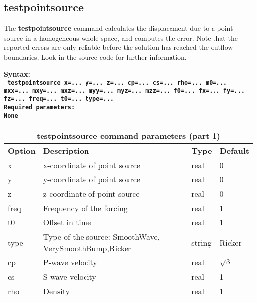 \documentclass[11pt]{report}
\begin{document}
\subsection{testpointsource}
\label{keyword:pointsource}
The {\bf testpointsource} command calculates the displacement due to a point source in a homogeneous
whole space, and computes the error. Note that the reported errors are only reliable before the
solution has reached the outflow boundaries. Look in the source code for further information.
\begin{flushleft}
\bf
Syntax:\\
\tt
testpointsource
x=... y=... z=... cp=... cs=... rho=... m0=... mxx=... mxy=... mxz=... myy=... myz=... mzz=... f0=... fx=... fy=... fz=... freq=... t0=... type=...
\\
\bf 
Required parameters:\\
\rm
None
\end{flushleft}
\begin{center}
\begin{tabular}{|l|p{8cm}|l|l|} \hline
\multicolumn{4}{|c|}{\bf testpointsource command parameters (part 1)}\\ \hline
\bf{Option} & \bf{Description} & \bf{Type} & \bf{Default} \\ \hline \hline
x    & x-coordinate of point source & real & 0 \\ \hline
y    & y-coordinate of point source & real & 0 \\ \hline
z    & z-coordinate of point source & real & 0 \\ \hline
\hline
freq & Frequency of the forcing & real & 1 \\ \hline
t0   & Offset in time & real & 1 \\ \hline
type & Type of the source: SmoothWave, VerySmoothBump,Ricker & string & Ricker \\ \hline
\hline
cp   & P-wave velocity & real & $\sqrt{3}$ \\ \hline
cs   & S-wave velocity & real & 1 \\ \hline
rho  & Density & real & 1 \\ \hline
\end{tabular}
\end{center}
\end{document}
